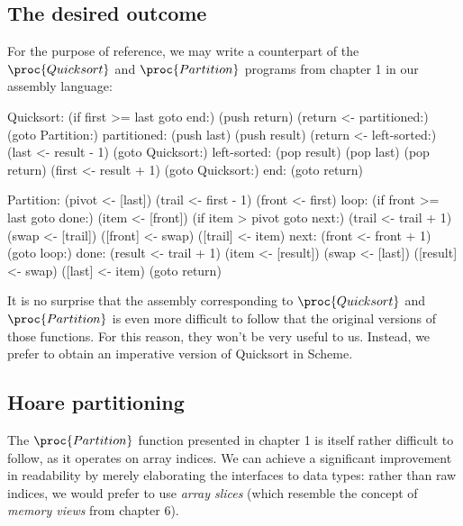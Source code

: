 \subsection{The desired outcome}

For the purpose of reference, we may write a counterpart
of the $\proc{Quicksort}$ and $\proc{Partition}$ programs
from chapter 1 in our assembly language:

\begin{multicols}{2}
\begin{Snippet}
Quicksort:
   (if first >= last goto end:)
   (push return)
   (return <- partitioned:)
   (goto Partition:)
partitioned:
   (push last)
   (push result)
   (return <- left-sorted:)
   (last <- result - 1)
   (goto Quicksort:)
left-sorted:
   (pop result)
   (pop last)
   (pop return)
   (first <- result + 1)
   (goto Quicksort:)
end:
   (goto return)
\end{Snippet}

\columnbreak

\begin{Snippet}
Partition:
   (pivot <- [last])
   (trail <- first - 1)
   (front <- first)
loop:
   (if front >= last goto done:)
   (item <- [front])
   (if item > pivot goto next:)
   (trail <- trail + 1)
   (swap <- [trail])
   ([front] <- swap)
   ([trail] <- item)
next:
   (front <- front + 1)
   (goto loop:)
done:
   (result <- trail + 1)
   (item <- [result])
   (swap <- [last])
   ([result] <- swap)
   ([last] <- item)
   (goto return)
\end{Snippet}
\end{multicols}

It is no surprise that the assembly corresponding to $\proc{Quicksort}$
and $\proc{Partition}$ is even more difficult to follow that the original
versions of those functions. For this reason, they won't be very useful
to us. Instead, we prefer to obtain an imperative version of Quicksort
in Scheme.

\subsection{Hoare partitioning}

The $\proc{Partition}$ function presented in chapter 1 is itself rather
difficult to follow, as it operates on array indices. We can achieve
a significant improvement in readability by merely elaborating the
interfaces to data types: rather than raw indices, we would prefer
to use \textit{array slices} (which resemble the concept of
\textit{memory views} from chapter 6).

